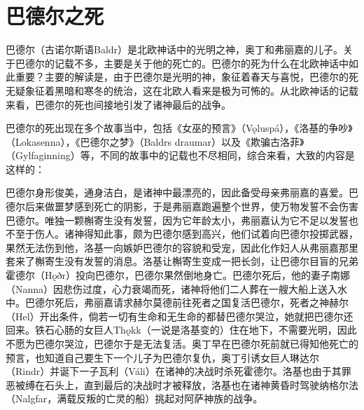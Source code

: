 \chapter{巴德尔之死}
巴德尔（古诺尔斯语Baldr）是北欧神话中的光明之神，奥丁和弗丽嘉的儿子。关于巴德尔的记载不多，主要是关于他的死亡的。巴德尔的死为什么在北欧神话中如此重要？主要的解读是，由于巴德尔是光明的神，象征着春天与喜悦，巴德尔的死无疑象征着黑暗和寒冬的统治，这在北欧人看来是极为可怖的。从北欧神话的记载来看，巴德尔的死也间接地引发了诸神最后的战争。

巴德尔的死出现在多个故事当中，包括《女巫的预言》（Vǫluspá），《洛基的争吵》（Lokasenna），《巴德尔之梦》（Baldrs draumar）以及《欺骗古洛菲》（Gylfaginning）等，不同的故事中的记载也不尽相同，综合来看，大致的内容是这样的：

巴德尔身形俊美，通身洁白，是诸神中最漂亮的，因此备受母亲弗丽嘉的喜爱。巴德尔后来做噩梦感到死亡的阴影，于是弗丽嘉跑遍整个世界，使万物发誓不会伤害巴德尔。唯独一颗槲寄生没有发誓，因为它年龄太小，弗丽嘉认为它不足以发誓也不至于伤人。诸神得知此事，颇为巴德尔感到高兴，他们试着向巴德尔投掷武器，果然无法伤到他，洛基一向嫉妒巴德尔的容貌和受宠，因此化作妇人从弗丽嘉那里套来了槲寄生没有发誓的消息。洛基让槲寄生变成一把长剑，让巴德尔目盲的兄弟霍德尔（Hǫðr）投向巴德尔，巴德尔果然倒地身亡。巴德尔死后，他的妻子南娜（Nanna）因悲伤过度，心力衰竭而死，诸神将他们二人葬在一艘大船上送入水中。巴德尔死后，弗丽嘉请求赫尔莫德前往死者之国复活巴德尔，死者之神赫尔（Hel）开出条件，倘若一切有生命和无生命的都替巴德尔哭泣，她就把巴德尔还回来。铁石心肠的女巨人Thǫkk（一说是洛基变的）住在地下，不需要光明，因此不愿为巴德尔哭泣，巴德尔于是无法复活。奥丁早在巴德尔死前就已得知他死亡的预言，也知道自己要生下一个儿子为巴德尔复仇，奥丁引诱女巨人琳达尔（Rindr）并诞下一子瓦利（Váli）在诸神的决战时杀死霍德尔。洛基也由于其罪恶被缚在石头上，直到最后的决战时才被释放，洛基也在诸神黄昏时驾驶纳格尔法（Nalgfar，满载反叛的亡灵的船）挑起对阿萨神族的战争。

